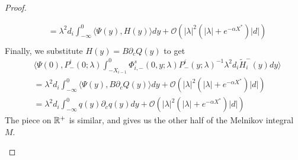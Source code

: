 \documentclass[thesis.tex]{subfiles}
\begin{document}
\begin{lemma}
\begin{proof}
\begin{enumerate}
\begin{align*}
&= \lambda^2 d_i \int_{-\infty}^0 \langle \Psi(y), H(y) \rangle dy + \mathcal{O}(|\lambda|^2( |\lambda| + {e^{-\alpha X^*}})|d|) \\
\end{align*}
Finally, we substitute $H(y) = B \partial_c Q(y)$ to get
\begin{align*}
&\langle \Psi(0), P^i_-(0; \lambda) \int_{-X_{i-1}}^0 \Phi^s_{i,-}(0, y; \lambda) P^i_-(y; \lambda)^{-1} \lambda^2 d_i \tilde{H}_i^-(y) dy \rangle \\
&= \lambda^2 d_i \int_{-\infty}^0 \langle \Psi(y), B \partial_c Q(y) \rangle dy + \mathcal{O}(|\lambda|^2( |\lambda| + {e^{-\alpha X^*}})|d|) \\
&= \lambda^2 d_i \int_{-\infty}^0 q(y) \partial_c q(y) dy + \mathcal{O}(|\lambda|^2( |\lambda| + {e^{-\alpha X^*}})|d|)
\end{align*}
The piece on $\mathbb{R}^+$ is similar, and gives us the other half of the Melnikov integral $M$.


\end{enumerate}
\end{proof}
\end{lemma}
\end{document}
